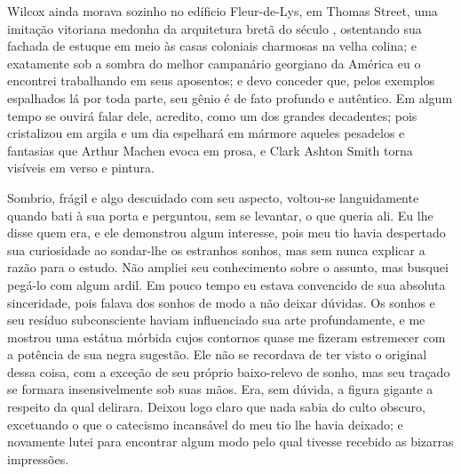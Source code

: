 Wilcox ainda morava sozinho no edíficio Fleur-de-Lys, em Thomas Street,
uma imitação vitoriana medonha da arquitetura bretã do século ,
ostentando sua fachada de estuque em meio às casas coloniais charmosas
na velha colina; e exatamente sob a sombra do melhor campanário
georgiano da América eu o encontrei trabalhando em seus aposentos; e
devo conceder que, pelos exemplos espalhados lá por toda parte, seu
gênio é de fato profundo e autêntico. Em algum tempo se ouvirá falar
dele, acredito, como um dos grandes decadentes; pois cristalizou em
argila e um dia espelhará em mármore aqueles pesadelos e fantasias que
Arthur Machen evoca em prosa, e Clark Ashton Smith torna visíveis em verso e pintura.

Sombrio, frágil e algo descuidado com seu aspecto, voltou-se
languidamente quando bati à sua porta e perguntou, sem se levantar, o
que queria ali. Eu lhe disse quem era, e ele demonstrou algum interesse,
pois meu tio havia despertado sua curiosidade ao sondar-lhe os estranhos
sonhos, mas sem nunca explicar a razão para o estudo. Não ampliei seu
conhecimento sobre o assunto, mas busquei pegá-lo com algum ardil. Em
pouco tempo eu estava convencido de sua absoluta sinceridade, pois
falava dos sonhos de modo a não deixar dúvidas. Os sonhos e seu resíduo
subconsciente haviam influenciado sua arte profundamente, e me mostrou
uma estátua mórbida cujos contornos quase me fizeram estremecer com a
potência de sua negra sugestão. Ele não se recordava de ter visto o
original dessa coisa, com a exceção de seu próprio baixo-relevo de
sonho, mas seu traçado se formara insensivelmente sob suas mãos. Era,
sem dúvida, a figura gigante a respeito da qual delirara. Deixou logo
claro que nada sabia do culto obscuro, excetuando o que o catecismo
incansável do meu tio lhe havia deixado; e novamente lutei para
encontrar algum modo pelo qual tivesse recebido as bizarras impressões.

